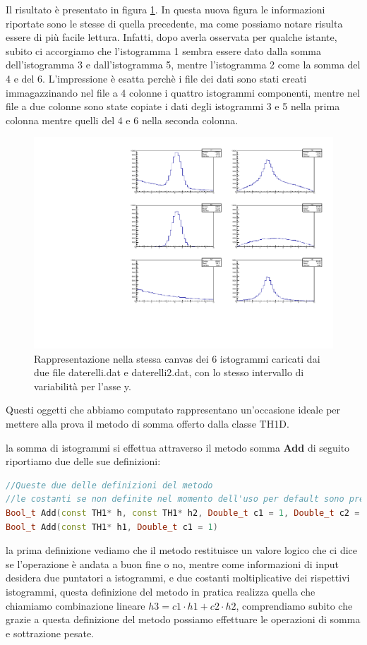 \documentclass[11pt,fleqn]{book} %
\begin{document}
Il risultato è presentato in figura \ref{fig6h2}. In questa nuova figura le informazioni riportate sono le stesse di quella precedente, ma come possiamo notare risulta essere di più facile lettura. Infatti, dopo averla osservata per qualche istante, subito ci accorgiamo che l'istogramma 1 sembra essere dato dalla somma dell'istogramma 3 e dall'istogramma 5, mentre l'istogramma 2 come la somma del 4 e del 6.
L'impressione è esatta perchè i file dei dati sono stati creati immagazzinando nel file a 4 colonne i quattro istogrammi componenti, mentre nel file a due colonne sono state copiate i dati degli istogrammi 3 e 5 nella prima colonna mentre quelli del 4 e 6 nella seconda colonna.  
\begin{figure}[h]
\centering
\includegraphics[scale=0.8]{Pictures/figuratutti2.pdf}
\caption{Rappresentazione nella stessa canvas dei 6 istogrammi caricati dai due file daterelli.dat e daterelli2.dat, con lo stesso intervallo di variabilità per l'asse y. \label{fig6h2}}
\end{figure}
Questi oggetti che abbiamo computato rappresentano un'occasione ideale per mettere alla prova il metodo di somma offerto dalla classe TH1D.

la somma di istogrammi si effettua attraverso il metodo somma \textbf{Add} di seguito riportiamo due delle sue definizioni:
\begin{lstlisting}[language=c++]
//Queste due delle definizioni del metodo
//le costanti se non definite nel momento dell'uso per default sono prese pari a 1
Bool_t Add(const TH1* h, const TH1* h2, Double_t c1 = 1, Double_t c2 = 1) 	// *MENU*
Bool_t Add(const TH1* h1, Double_t c1 = 1)
\end{lstlisting}
la prima definizione vediamo che il metodo restituisce un valore logico che ci dice se l'operazione è andata a buon fine o no, mentre come informazioni di input desidera due puntatori a istogrammi, e due costanti moltiplicative dei rispettivi istogrammi, questa definizione del metodo in pratica realizza quella che chiamiamo combinazione lineare $h3 = c1 \cdot h1 + c2 \cdot h2$, comprendiamo subito che grazie a questa definizione del metodo possiamo effettuare le operazioni di somma e sottrazione pesate.
\end{document}
